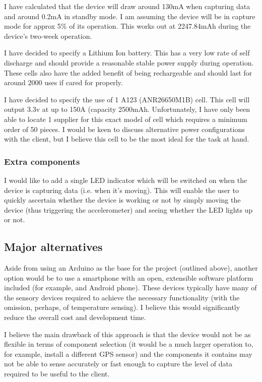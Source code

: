 \documentclass[a4paper, twoside]{article}
\begin{document}
I have calculated that the device will draw around 130mA when capturing data and
around 0.2mA in standby mode. I am assuming the device will be in capture mode
for approx 5\% of its operation. This works out at 2247.84mAh during the
device's two-week operation.

I have decided to specify a Lithium Ion battery. This has a very low rate of
self discharge and should provide a reasonable stable power supply during
operation. These cells also have the added benefit of being rechargeable and
should last for around 2000 uses if cared for properly.

I have decided to specify the use of 1 A123 (ANR26650M1B) cell. This cell will output
3.3v at up to 150A (capacity 2500mAh. Unfortunately, I have only been able to
locate 1 supplier for this exact model of cell which requires a minimum order of
50 pieces. I would be keen to discuss alternative power configurations with the
client, but I believe this cell to be the most ideal for the task at hand.

\subsubsection{Extra components}
I would like to add a single LED indicator which will be switched on when the
device is capturing data (i.e. when it's moving). This will enable the user to
quickly ascertain whether the device is working or not by simply moving the
device (thus triggering the accelerometer) and seeing whether the LED lights up
or not.

\subsection{Major alternatives}
Aside from using an Arduino as the base for the project (outlined above),
another option would be to use a smartphone with an open, extensible software
platform included (for example, and Android phone). These devices typically have
many of the sensory devices required to achieve the necessary functionality
(with the omission, perhaps, of temperature sensing). I believe this would
significantly reduce the overall cost and development time.

I believe the main drawback of this approach is that the device would not be as
flexible in terms of component selection (it would be a much larger operation
to, for example, install a different GPS sensor) and the components it contains
may not be able to sense accurately or fast enough to capture the level of data
required to be useful to the client.
\end{document}
